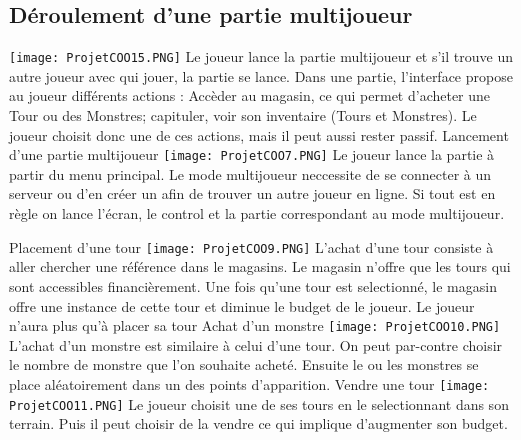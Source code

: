 \documentclass[12pt, letterpaper]{article}
\begin{document}
{\begin{landscape}
\subsection{Déroulement d'une partie multijoueur}
\texttt{[image: ProjetCOO15.PNG]} \newline
Le joueur lance la partie multijoueur et s'il trouve un autre joueur avec qui jouer, la partie se lance. Dans une partie, l'interface propose au joueur différents actions : Accèder au magasin, ce qui permet d'acheter une Tour ou des Monstres; capituler, voir son inventaire (Tours et Monstres). Le joueur choisit donc une de ces actions, mais il peut aussi rester passif.
\clearpage
\BgThispage
\large{Lancement d'une partie multijoueur}\newline
\texttt{[image: ProjetCOO7.PNG]} \newline
 Le joueur lance la partie à partir du menu principal. Le mode multijoueur neccessite de se connecter à un serveur ou d'en créer un afin de trouver un autre joueur en ligne. Si tout est en règle on lance l'écran, le control et la partie correspondant au mode multijoueur.

\clearpage
\BgThispage
\large{Placement d'une tour} \newline
\texttt{[image: ProjetCOO9.PNG]} \newline
L'achat d'une tour consiste à aller chercher une référence dans le magasins. Le magasin n'offre que les tours qui sont accessibles financièrement. Une fois qu'une tour est selectionné, le magasin offre une instance de cette tour et diminue le budget de le joueur. Le joueur n'aura plus qu'à placer sa tour
\clearpage
\BgThispage
\large{Achat d'un monstre} \newline
\texttt{[image: ProjetCOO10.PNG]} \newline
L'achat d'un monstre est similaire à celui d'une tour. On peut par-contre choisir le nombre de monstre que l'on souhaite acheté. Ensuite le ou les monstres se place aléatoirement dans un des points d'apparition.
\clearpage
\BgThispage
\large{Vendre une tour} \newline
\texttt{[image: ProjetCOO11.PNG]} \newline
Le joueur choisit une de ses tours en le selectionnant dans son terrain. Puis il peut choisir de la vendre ce qui implique d'augmenter son budget.
\clearpage
\end{landscape}
\BgThispage
}
\end{document}
